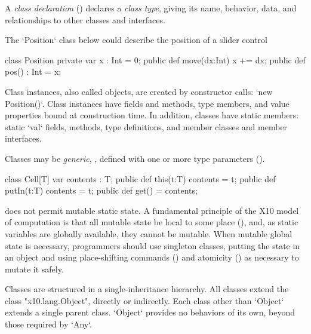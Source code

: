 
A {\em class declaration} () declares a {\em class type},
giving its name, behavior, data, and relationships to other classes and
interfaces. 

\begin{ex}

The \xcd`Position` class below could describe the position of a slider
control

\begin{xten}
class Position {
  private var x : Int = 0;
  public def move(dx:Int) { x += dx; }
  public def pos() : Int = x;
}
\end{xten}
%
\end{ex}
Class instances, also called objects, are created by constructor calls: 
\xcd`new Position()`. Class
instances have fields and methods, type members, and value properties bound at
construction time. In addition, classes have static members: static \xcd`val` fields,
methods, type definitions, and member classes and member interfaces.

Classes may be {\em generic}, \ie, defined with one or more type
parameters ().  

\begin{xten}
class Cell[T] {
  var contents : T;
  public def this(t:T) { contents = t;  }
  public def putIn(t:T) { contents = t; }
  public def get() = contents;
  }
\end{xten}


\Xten{} does not permit mutable static state. A fundamental principle of the
X10 model of computation is that all mutable state be local to some place
(), and, as static variables are
globally available, they
cannot be mutable. When mutable global state is necessary, programmers should
use singleton classes, putting the state in an object and using place-shifting
commands () and atomicity () as necessary
to mutate it safely.


Classes are structured in a single-inheritance hierarchy. All classes extend
the class \xcd"x10.lang.Object", directly or indirectly. Each class other than
\xcd`Object` extends a single parent class.  \xcd`Object` provides no behaviors
of its own, beyond those required by \xcd`Any`.


